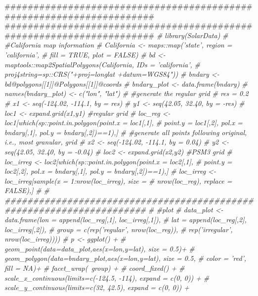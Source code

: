 \documentclass[twocolumn]{article}
\newenvironment{Shaded}{\begin{snugshade}}{\end{snugshade}}
\newcommand{\CommentTok}[1]{\textcolor[rgb]{0.56,0.35,0.01}{\textit{#1}}}
\newcommand{\NormalTok}[1]{#1}
\begin{document}
\begin{Shaded}
\begin{Highlighting}[]
\NormalTok{#####################################################################}
\NormalTok{#####################################################################}
\CommentTok{# library(SolarData)}
\CommentTok{# #California map information}
\CommentTok{# California <- maps::map('state', region = 'california', }
\CommentTok{#               fill = TRUE, plot = FALSE)}
\CommentTok{# bd <- maptools::map2SpatialPolygons(California, IDs = 'california',}
\CommentTok{#       proj4string=sp::CRS("+proj=longlat +datum=WGS84"))}
\CommentTok{# bndary <- bd@polygons[[1]]@Polygons[[1]]@coords}
\CommentTok{# bndary_plot <- data.frame(bndary)}
\CommentTok{# names(bndary_plot) <- c("lon", "lat")}
\CommentTok{# #generate the regular grid}
\CommentTok{# res = 0.2}
\CommentTok{# x1 <- seq(-124.02, -114.1, by = res)}
\CommentTok{# y1 <- seq(42.05, 32.40, by = -res)}
\CommentTok{# loc1 <- expand.grid(x1,y1) #regular grid}
\CommentTok{# loc_reg <- loc1[which(sp::point.in.polygon(point.x = loc1[,1], }
\CommentTok{#    point.y = loc1[,2], pol.x = bndary[,1], pol.y = bndary[,2])==1),]}
\CommentTok{# #generate all points following original, i.e., most granular, grid}
\CommentTok{# x2 <- seq(-124.02, -114.1, by = 0.04)}
\CommentTok{# y2 <- seq(42.05, 32.40, by = -0.04)}
\CommentTok{# loc2 <- expand.grid(x2,y2) #PSM3 grid}
\CommentTok{# loc_irreg <- loc2[which(sp::point.in.polygon(point.x = loc2[,1], }
\CommentTok{#    point.y = loc2[,2], pol.x = bndary[,1], pol.y = bndary[,2])==1),]}
\CommentTok{# loc_irreg <- loc_irreg[sample(x = 1:nrow(loc_irreg), size = }
\CommentTok{#              nrow(loc_reg), replace = FALSE),]}
\CommentTok{# }
\CommentTok{# #####################################################################}
\CommentTok{# #plot}
\CommentTok{# data_plot <- data.frame(lon = append(loc_reg[,1], loc_irreg[,1]), }
\CommentTok{#                         lat = append(loc_reg[,2], loc_irreg[,2]), }
\CommentTok{#                         group = c(rep('regular', nrow(loc_reg)), }
\CommentTok{#                         rep('irregular', nrow(loc_irreg))))}
\CommentTok{# p <- ggplot() + }
\CommentTok{#      geom_point(data=data_plot,aes(x=lon,y=lat), size = 0.5)+}
\CommentTok{#      geom_polygon(data=bndary_plot,aes(x=lon,y=lat), size = 0.5, }
\CommentTok{#                   color = 'red', fill = NA)+}
\CommentTok{#      facet_wrap(~group) +}
\CommentTok{#      coord_fixed() +}
\CommentTok{#      scale_x_continuous(limits=c(-124.5, -114), expand = c(0, 0)) +}
\CommentTok{#      scale_y_continuous(limits=c(32, 42.5), expand = c(0, 0)) +}

\end{Highlighting}
\end{Shaded}
\end{document}
